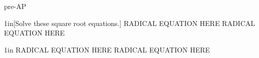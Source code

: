 \begin{taggedblock}{pre-AP}


    
\begin{my2Problems}[\normalsize]{1in}[Solve these square root equations.]
    {
        RADICAL EQUATION HERE
    }
    {
        RADICAL EQUATION HERE
    }
\end{my2Problems}

\begin{my2Problems}[\normalsize]{1in}
    {
        RADICAL EQUATION HERE
    }
    {
        RADICAL EQUATION HERE
    }
\end{my2Problems}



\end{taggedblock}